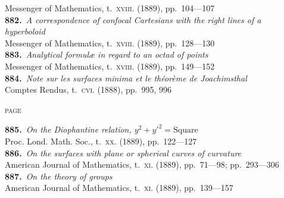 \documentclass[11pt,a4paper]{article}
\providecommand{\textsc}[1]{{\scshape #1}}
\begin{document}
\hspace*{2em}Messenger of Mathematics, t.~\textsc{xviii}. (1889), pp.~104---107\\[0.3em]
\textbf{882.}~\textit{A correspondence of confocal Cartesians with the right lines of a hyperboloid}~\\
\hspace*{2em}Messenger of Mathematics, t.~\textsc{xviii}. (1889), pp.~128---130\\[0.3em]
\textbf{883.}~\textit{Analytical formul\ae{} in regard to an octad of points}~\\
\hspace*{2em}Messenger of Mathematics, t.~\textsc{xviii}. (1889), pp.~149---152\\[0.3em]
\textbf{884.}~\textit{Note sur les surfaces minima et le th\'eor\`eme de Joachimsthal}~\\
\hspace*{2em}Comptes Rendus, t.~\textsc{cvi}. (1888), pp.~995, 996

\clearpage

\thispagestyle{plain}
\vspace*{1em}
\hfill\textsc{page}

\small
\noindent\textbf{885.}~\textit{On the Diophantine relation, $y^{2} + y'^{2} = \text{Square}$}~\\
\hspace*{2em}Proc. Lond. Math. Soc., t.~\textsc{xx}. (1889), pp.~122---127\\[0.3em]
\textbf{886.}~\textit{On the surfaces with plane or spherical curves of curvature}~\\
\hspace*{2em}American Journal of Mathematics, t.~\textsc{xi}. (1889), pp.~71---98; pp.~293---306\\[0.3em]
\textbf{887.}~\textit{On the theory of groups}~\\
\hspace*{2em}American Journal of Mathematics, t.~\textsc{xi}. (1889), pp.~139---157

\clearpage

\fancyhf{}
\fancyhead[L]{\small\thepage}
\fancyhead[C]{\small\textsc{classification.}}
\fancyhead[R]{}
\end{document}
